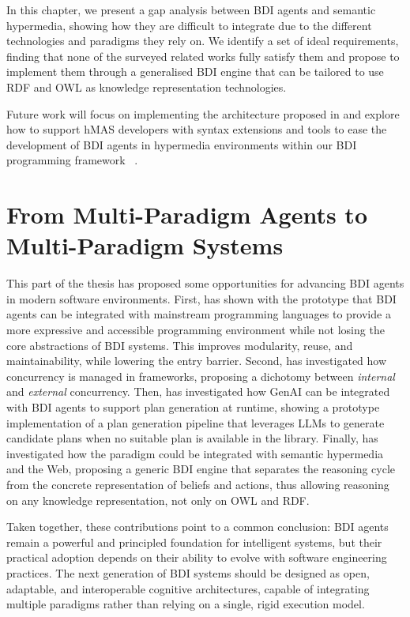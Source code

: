 In this chapter, 
we present a gap analysis between \ac{BDI} agents and semantic hypermedia,
showing how they are difficult to integrate due to the different technologies and paradigms they rely on.
%
We identify a set of ideal requirements, finding that none of the surveyed related works fully satisfy them
and propose to implement them through a generalised \ac{BDI} engine that can be tailored to use \ac{RDF} and \ac{OWL} as knowledge representation technologies.

Future work will focus on implementing the architecture proposed in 
and explore how to support \ac{hMAS} developers with syntax extensions
and tools to ease the development of \ac{BDI} agents in hypermedia environments
within our \ac{BDI} programming framework \jakta{}~\cite{DBLP:journals/sncs/BaiardiBCP24}.

\chapter{From Multi-Paradigm Agents to Multi-Paradigm Systems}
\label{chap:perspectives}

This part of the thesis has proposed some opportunities
for advancing \ac{BDI} agents in modern software environments.
%
First,
 has shown with the \jakta{} prototype
that \ac{BDI} agents can be integrated
with mainstream programming languages
to provide a more expressive and accessible programming environment
while not losing the core abstractions of \ac{BDI} systems.
%
This improves modularity, reuse, and maintainability,
while lowering the entry barrier.
%
Second,
 has investigated how concurrency is managed in \agentspeak{} frameworks,
proposing a dichotomy between \emph{internal} and \emph{external} concurrency.
%
Then,
 has investigated how \ac{GenAI} can be integrated with \ac{BDI} agents to support plan generation at runtime,
showing a \jakta{} prototype implementation of a plan generation pipeline that leverages \acp{LLM} to generate candidate plans when no suitable plan is available in the library.
%
Finally,
 has investigated how the paradigm could be integrated with semantic hypermedia and the Web,
proposing a generic \ac{BDI} engine that separates the reasoning cycle from the concrete representation of beliefs and actions,
thus allowing reasoning on any knowledge representation, not only on \ac{OWL} and \ac{RDF}.

Taken together, these contributions point to a common conclusion:
\ac{BDI} agents remain a powerful and principled foundation for intelligent systems,
but their practical adoption depends on their ability to evolve with software engineering practices.
%
The next generation of \ac{BDI} systems should be designed as open, adaptable, and interoperable cognitive architectures,
capable of integrating multiple paradigms rather than relying on a single, rigid execution model.

